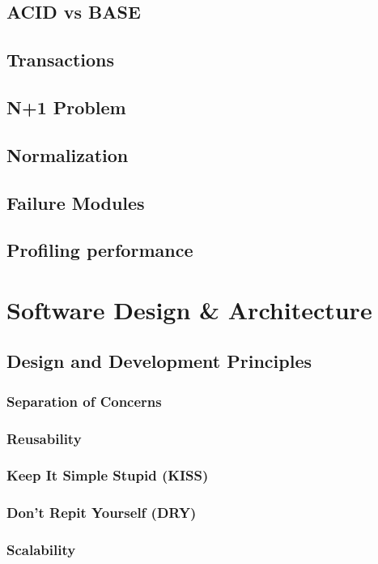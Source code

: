 \documentclass[a4paper]{article}
\begin{document}
    \subsection{ACID vs BASE}
    \subsection{Transactions}
    \subsection{N+1 Problem}
    \subsection{Normalization}
    \subsection{Failure Modules}
    \subsection{Profiling performance}
    
    
    \newpage
    \section{Software Design \& Architecture}
    \subsection{Design and Development Principles}
    \subsubsection{Separation of Concerns}
    \subsubsection{Reusability}
    \subsubsection{Keep It Simple Stupid (KISS)}
    \subsubsection{Don't Repit Yourself (DRY)}
    \subsubsection{Scalability}
\end{document}
